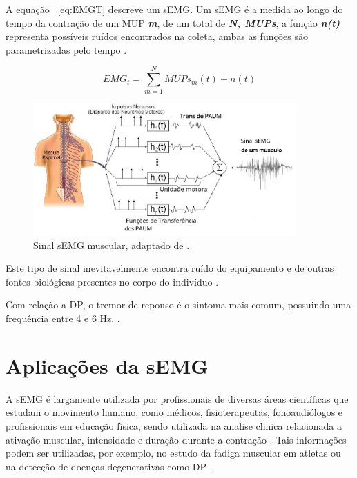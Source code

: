 A equação ~\ref{eq:EMGT} descreve um sEMG. Um sEMG é a medida ao longo do tempo da contração de um MUP \textit{\textbf{m}}, de um total de \textit{\textbf{N, MUPs}}, a função \textit{\textbf{n(t)}} representa possíveis ruídos encontrados na coleta, ambas as funções são parametrizadas pelo tempo \cite{yousefi2014characterizing}.

\begin{equation} \label{eq:EMGT}
    EMG_{t} =\sum_{m=1}^{N} MUPs_{m}(t)+n(t)
\end{equation}

\begin{figure}[!htb]
    \centering
     \includegraphics[width=0.9\textwidth]{figuras/Representacao-esquematica-da-geracao-do-Sinal-Mioeletrico-de-um-musculo-a-partir-da.eps}
     \caption{Sinal sEMG muscular, adaptado de .}
     \label{PAUM}
 \end{figure}

Este tipo de sinal inevitavelmente encontra ruído do equipamento e de outras fontes biológicas presentes no corpo do indivíduo \cite{yousefi2014characterizing}.

Com relação a DP, o tremor de repouso é o sintoma mais comum, possuindo uma frequência entre 4 e 6 Hz.
\cite{jankovic2008parkinson}.

\section{Aplicações da sEMG}
A sEMG é largamente utilizada por profissionais de diversas áreas científicas que estudam o movimento humano, como médicos, fisioterapeutas, fonoaudiólogos e profissionais em educação física, sendo utilizada na analise clinica relacionada a ativação muscular, intensidade e duração durante a contração \cite{nascimento2012surface}. Tais informações podem ser utilizadas, por exemplo, no estudo da fadiga muscular em atletas \cite{schmitz2012unchanged} ou na detecção de doenças degenerativas como DP \cite{eftaxias2015detection}.